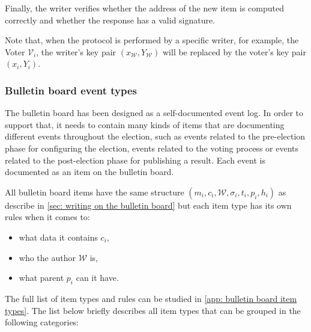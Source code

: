 Finally, the writer verifies whether the address of the new item is computed correctly and whether the response has a valid signature.

Note that, when the protocol is performed by a specific writer, for example, the Voter $\mathcal{V}_i$, the writer's key pair $(x_\mathcal{W}, Y_\mathcal{W})$ will be replaced by the voter's key pair $(x_i, Y_i)$.


\subsubsection{Bulletin board event types} \label{sec: bulletin board event types}
The bulletin board has been designed as a self-documented event log. In order to support that, it needs to contain many kinds of items that are documenting different events throughout the election, such as events related to the pre-election phase for configuring the election, events related to the voting process or events related to the post-election phase for publishing a result. Each event is documented as an item on the bulletin board.

All bulletin board items have the same structure $(m_i, c_i, \mathcal{W}, \sigma_i, t_i, p_i, h_i)$ as describe in \cref{sec: writing on the bulletin board} but each item type has its own rules when it comes to:
\begin{itemize}
    \item what data it contains $c_i$,
    \item who the author $\mathcal{W}$ is,
    \item what parent $p_i$ can it have.
\end{itemize}

The full list of item types and rules can be studied in \cref{app: bulletin board item types}. The list below briefly describes all item types that can be grouped in the following categories:

